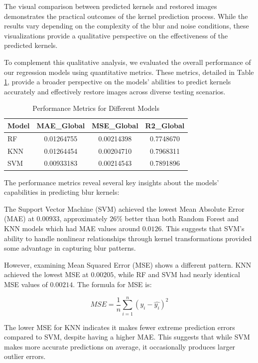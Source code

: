 \documentclass[twoside,11pt]{article}
\begin{document}
The visual comparison between predicted kernels and restored images demonstrates the practical outcomes of the kernel prediction process. While the results vary depending on the complexity of the blur and noise conditions, these visualizations provide a qualitative perspective on the effectiveness of the predicted kernels.

To complement this qualitative analysis, we evaluated the overall performance of our regression models using quantitative metrics. These metrics, detailed in Table \ref{tab:performance}, provide a broader perspective on the models' abilities to predict kernels accurately and effectively restore images across diverse testing scenarios.

\begin{table}[h]
\caption{Performance Metrics for Different Models}
\label{tab:performance}
\begin{center}
\begin{tabular}{lccc}
\hline
Model & MAE\_Global & MSE\_Global & R2\_Global \\
\hline
RF & 0.01264755 & 0.00214398 & 0.7748670 \\
KNN & 0.01264454 & 0.00204710 & 0.7968311 \\
SVM & 0.00933183 & 0.00214543 & 0.7891896 \\
\hline
\end{tabular}
\end{center}
\end{table}


The performance metrics reveal several key insights about the models' capabilities in predicting blur kernels:

The Support Vector Machine (SVM) achieved the lowest Mean Absolute Error (MAE) at $0.00933$, approximately $26\%$ better than both Random Forest and KNN models which had MAE values around $0.0126$. This suggests that SVM's ability to handle nonlinear relationships through kernel transformations provided some advantage in capturing blur patterns.

However, examining Mean Squared Error (MSE) shows a different pattern. KNN achieved the lowest MSE at $0.00205$, while RF and SVM had nearly identical MSE values of $0.00214$. The formula for MSE is:

$$
MSE = \frac{1}{n}\sum_{i=1}^{n}(y_i - \hat{y_i})^2
$$

The lower MSE for KNN indicates it makes fewer extreme prediction errors compared to SVM, despite having a higher MAE. This suggests that while SVM makes more accurate predictions on average, it occasionally produces larger outlier errors.
\end{document}

